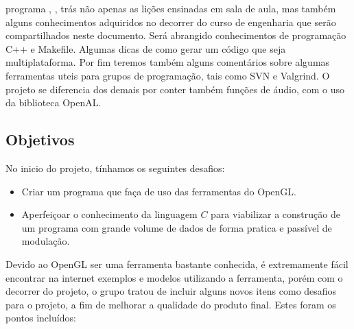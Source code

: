 ﻿%



%
%

 programa , \assunto, trás não apenas as lições ensinadas em sala de aula, mas também alguns conhecimentos adquiridos no decorrer do curso de engenharia que serão compartilhados neste documento. Será abrangido conhecimentos de programação C++ e Makefile. Algumas dicas de como gerar um código que seja multiplataforma.  Por fim teremos também alguns comentários sobre algumas ferramentas uteis para grupos de programação, tais como SVN e Valgrind. O projeto se diferencia dos demais por conter também funções de áudio, com o uso da biblioteca OpenAL.



\subsection{Objetivos}\label{obj}


No inicio do projeto, tínhamos os seguintes desafios:

\begin{itemize}
	\item Criar um programa que faça de uso das ferramentas do OpenGL.
	\item Aperfeiçoar o conhecimento da linguagem $C$ para viabilizar a construção de um programa com grande volume de dados de forma pratica e passível de modulação.
\end{itemize}

Devido ao OpenGL ser uma ferramenta bastante conhecida, é extremamente fácil encontrar na internet exemplos e modelos utilizando a ferramenta, porém com o decorrer do projeto, o grupo tratou de incluir alguns novos itens como desafios para o projeto, a fim de melhorar a qualidade do produto final. Estes foram os pontos incluídos:

